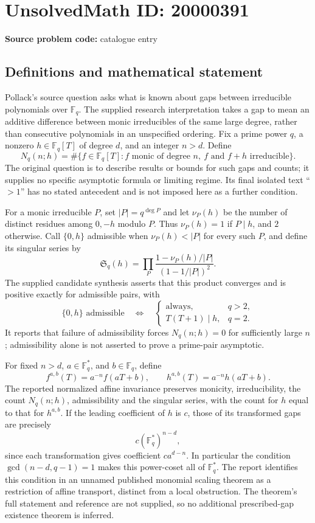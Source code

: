 \documentclass[11pt]{article}
\newcommand{\F}{\mathbb{F}}
\begin{document}
\section*{UnsolvedMath ID: 20000391}
\textbf{Source problem code:} catalogue entry
\subsection{Definitions and mathematical statement}
Pollack's source question asks what is known about gaps between irreducible polynomials over \(\F_q\). The supplied research interpretation takes a gap to mean an additive difference between monic irreducibles of the same large degree, rather than consecutive polynomials in an unspecified ordering. Fix a prime power \(q\), a nonzero \(h\in\F_q[T]\) of degree \(d\), and an integer \(n>d\). Define
\[
 N_q(n;h)=\#\{f\in\F_q[T]:f\text{ monic of degree }n,\ f\text{ and }f+h\text{ irreducible}\}.
\]
The original question is to describe results or bounds for such gaps and counts; it supplies no specific asymptotic formula or limiting regime. Its final isolated text ``\(>1\)'' has no stated antecedent and is not imposed here as a further condition.

For a monic irreducible \(P\), set \(|P|=q^{\deg P}\) and let \(\nu_P(h)\) be the number of distinct residues among \(0,-h\) modulo \(P\). Thus \(\nu_P(h)=1\) if \(P\mid h\), and \(2\) otherwise. Call \(\{0,h\}\) admissible when \(\nu_P(h)<|P|\) for every such \(P\), and define its singular series by
\[
 \mathfrak S_q(h)=\prod_P
 \frac{1-\nu_P(h)/|P|}{(1-1/|P|)^2}.
\]
The supplied candidate synthesis asserts that this product converges and is positive exactly for admissible pairs, with
\[
 \{0,h\}\text{ admissible}\quad\Longleftrightarrow\quad
 \begin{cases}
 \text{always},&q>2,\\
 T(T+1)\mid h,&q=2.
 \end{cases}
\]
It reports that failure of admissibility forces \(N_q(n;h)=0\) for sufficiently large \(n\); admissibility alone is not asserted to prove a prime-pair asymptotic.

For fixed \(n>d\), \(a\in\F_q^*\), and \(b\in\F_q\), define
\[
 f^{a,b}(T)=a^{-n}f(aT+b),\qquad h^{a,b}(T)=a^{-n}h(aT+b).
\]
The reported normalized affine invariance preserves monicity, irreducibility, the count \(N_q(n;h)\), admissibility and the singular series, with the count for \(h\) equal to that for \(h^{a,b}\). If the leading coefficient of \(h\) is \(c\), those of its transformed gaps are precisely
\[
 c(\F_q^*)^{n-d},
\]
since each transformation gives coefficient \(ca^{d-n}\). In particular the condition \(\gcd(n-d,q-1)=1\) makes this power-coset all of \(\F_q^*\). The report identifies this condition in an unnamed published monomial scaling theorem as a restriction of affine transport, distinct from a local obstruction. The theorem's full statement and reference are not supplied, so no additional prescribed-gap existence theorem is inferred.
\end{document}
